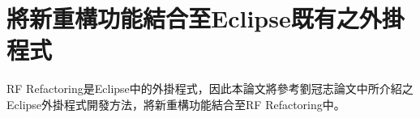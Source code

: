 \section{將新重構功能結合至Eclipse既有之外掛程式}\label{s3.4}
\indent
RF Refactoring是Eclipse中的外掛程式，因此本論文將參考劉冠志論文\cite{LIU-Thesis}中所介紹之Eclipse外掛程式開發方法，將新重構功能結合至RF Refactoring中。



